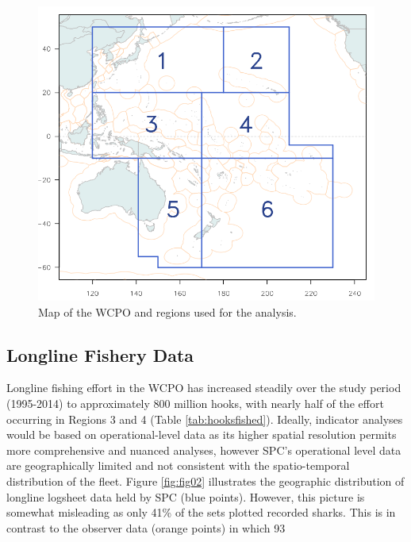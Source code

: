 \documentclass[12pt]{SCreport}
\begin{document}
\begin{figure}
\begin{center}
\includegraphics[width=\textwidth]{../GRAPHICS/Defined/FIG_01_MAP}
\caption{\label{fig:fig01} Map of the WCPO and regions used for the analysis.}
\end{center}
\end{figure}


\subsection{Longline Fishery Data}
  
Longline fishing effort in the WCPO has increased steadily over the study period (1995-2014) to approximately 800 million hooks, with nearly half of the effort occurring in Regions 3 and 4 (Table \ref{tab:hooksfished}).  Ideally, indicator analyses would be based on operational-level data as its higher spatial resolution permits more comprehensive and nuanced analyses, however SPC’s operational level data are geographically limited and not consistent with the spatio-temporal distribution of the fleet.  Figure \ref{fig:fig02} illustrates the geographic distribution of longline logsheet data held by SPC (blue points). However, this picture is somewhat misleading as only 41\% of the sets plotted recorded sharks. This is in contrast to the observer data (orange points) in which 93%
\end{document}
